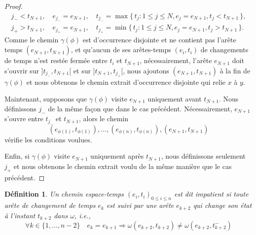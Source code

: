 \documentclass[titlepage,a4paper,12pt]{article}
\newcounter{d}
\newcounter{t}
\newcounter{p}
\newcounter{c}
\newcounter{a}
\newcounter{l}
\newtheorem{defi}[d]{Définition}
\begin{document}
\begin{proof}
\begin{align*}
{j_-}< t_{N+1},\quad e_{j_-} = e_{N+1},\quad t_{j_-} = \max \big\{\,t_j:1\leqslant j \leqslant N, e_j = e_{N+1}, t_j < t_{N+1}\,\big\},\\
{j_+}> t_{N+1},\quad e_{j_+} = e_{N+1},\quad t_{j_+} = \min \big\{\,t_j:1\leqslant j \leqslant N, e_j = e_{N+1}, t_j > t_{N+1}\,\big\}.
\end{align*}
Comme le chemin $\gamma(\phi)$ est d'occurrence disjointe et ne contient pas l'arête temps $(e_{N+1},t_{N+1})$, et qu'aucun de ses arêtes-temps $(e_i,t_i)$ de changements de temps n'est restée fermée entre $t_i$ et $t_{N+1}$, nécessairement, l'arête $e_{N+1}$ doit s'ouvrir sur $]t_{j_-},t_{N+1}[$ et sur $]t_{N+1},t_{j_+}[$, nous ajoutons $(e_{N+1},t_{N+1})$ à la fin de $\gamma(\phi)$ et nous obtenons le chemin extrait d'occurrence disjointe qui relie $x$ à $y$.

Maintenant, supposons que $\gamma(\phi)$ visite $e_{N+1}$ uniquement avant $t_{N+1}$. Nous définissons $j_-$ de la même façon que dans le cas précédent. Nécessairement, $e_{N+1}$ s'ouvre entre $t_{j_-}$ et $t_{N+1}$, alors le chemin $$(e_{\phi(1)},t_{\phi(1)}),\dots, (e_{\phi(n)},t_{\phi(n)}),(e_{N+1},t_{N+1})$$ vérifie les conditions voulues.

Enfin, si $\gamma(\phi)$ visite $e_{N+1}$ uniquement après $t_{N+1}$, nous définissons seulement $j_+$ et nous obtenons le chemin extrait voulu de la même manière que le cas précédent.
\end{proof}

\begin{defi}
Un chemin espace-temps $(e_i,t_i)_{0\leqslant i \leqslant n}$ est dit impatient si toute arête de changement de temps $e_k$ est suivi par une arête $e_{k+2}$ qui change son état à l'instant $t_{k+2}$ dans $\omega$, i.e.,
$$ \forall k \in \{1,\dots,n-2\} \quad e_k = e_{k+1} \Rightarrow \omega(e_{k+2},t_{k+2}) \neq \omega(e_{k+2},t_{k+2}^-)
$$
\end{defi}
\end{document}
